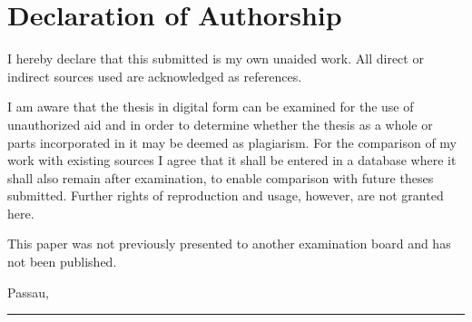 
\chapter{Declaration of Authorship}

	
	I hereby declare that this \thesisType{} submitted is my own unaided work. All direct or indirect sources used are acknowledged as references. 
	
	I am aware that the thesis in digital form can be examined for the use of unauthorized aid and in order to determine whether the thesis as a whole or parts incorporated in it may be deemed as plagiarism. For the comparison of my work with existing sources I agree that it shall be entered in a database where it shall also remain after examination, to enable comparison with future theses submitted. Further rights of reproduction and usage, however, are not granted here. 
	
	This paper was not previously presented to another examination board and has not been published. 
	
	

	\vspace{3cm}

	Passau, \thedate

	\vspace{2cm}

	\parbox{8cm}{
		\hrule \strut \theauthor
	}

